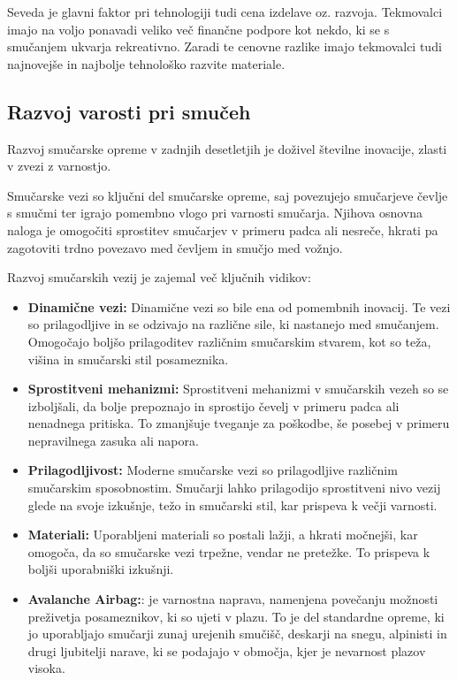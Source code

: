 \documentclass{article}
\begin{document}
Seveda je glavni faktor pri tehnologiji tudi cena izdelave oz. razvoja. Tekmovalci imajo na voljo ponavadi veliko več finančne podpore kot nekdo, ki se s smučanjem ukvarja rekreativno.
Zaradi te cenovne razlike imajo tekmovalci tudi najnovejše in najbolje tehnološko razvite materiale.
\subsection*{Razvoj varosti pri smučeh}

Razvoj smučarske opreme v zadnjih desetletjih je doživel številne inovacije, zlasti v zvezi z varnostjo.

Smučarske vezi so ključni del smučarske opreme, saj povezujejo smučarjeve čevlje s smučmi ter igrajo pomembno vlogo pri varnosti smučarja. 
Njihova osnovna naloga je omogočiti sprostitev smučarjev v primeru padca ali nesreče, hkrati pa zagotoviti trdno povezavo med čevljem in smučjo med vožnjo. 
\newline 

Razvoj smučarskih vezij je zajemal več ključnih vidikov:

\begin{itemize}
    \item \textbf{Dinamične vezi:} Dinamične vezi so bile ena od pomembnih inovacij. Te vezi so prilagodljive in se odzivajo na različne sile, ki nastanejo med smučanjem. Omogočajo boljšo prilagoditev različnim smučarskim stvarem, kot so teža, višina in smučarski stil posameznika.
    \item \textbf{Sprostitveni mehanizmi:} Sprostitveni mehanizmi v smučarskih vezeh so se izboljšali, da bolje prepoznajo in sprostijo čevelj v primeru padca ali nenadnega pritiska. To zmanjšuje tveganje za poškodbe, še posebej v primeru nepravilnega zasuka ali napora.
    \item \textbf{Prilagodljivost:} Moderne smučarske vezi so prilagodljive različnim smučarskim sposobnostim. Smučarji lahko prilagodijo sprostitveni nivo vezij glede na svoje izkušnje, težo in smučarski stil, kar prispeva k večji varnosti.
    \item \textbf{Materiali:} Uporabljeni materiali so postali lažji, a hkrati močnejši, kar omogoča, da so smučarske vezi trpežne, vendar ne pretežke. To prispeva k boljši uporabniški izkušnji.
    \item \textbf{Avalanche Airbag:}:  je varnostna naprava, namenjena povečanju možnosti preživetja posameznikov, ki so ujeti v plazu. To je del standardne opreme, ki jo uporabljajo smučarji zunaj urejenih smučišč, deskarji na snegu, alpinisti in drugi ljubitelji narave, ki se podajajo v območja, kjer je nevarnost plazov visoka.
\end{itemize}
\end{document}
